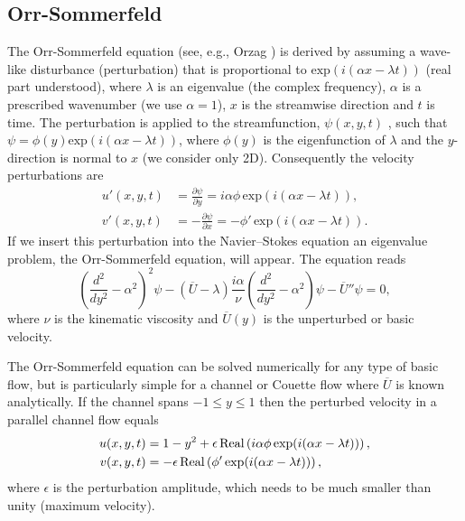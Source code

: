 \subsection{Orr-Sommerfeld}
\label{sec:mortensen:OS}
The Orr-Sommerfeld equation (see, e.g., Orzag \cite{Orzag1971}) is derived by assuming a wave-like disturbance (perturbation) that is proportional to $\text{exp}(i(\alpha x-\lambda t))$ (real part understood), where $\lambda$ is an eigenvalue (the complex frequency), $\alpha$ is a prescribed wavenumber (we use $\alpha=1$), $x$ is the streamwise direction and $t$ is time. The perturbation is applied to the streamfunction, $\psi(x,y,t)$ , such that $\psi=\phi(y) \text{exp}(i(\alpha x- \lambda t))$, where $\phi(y)$ is the eigenfunction of $\lambda$ and the $y$-direction is normal to $x$ (we consider only 2D). Consequently the velocity perturbations are
\begin{align}
 u'(x,y,t)&=\frac{\partial \psi}{\partial y}=i\alpha \phi \, \text{exp}(i(\alpha x- \lambda t)),\\
 v'(x,y,t)&=-\frac{\partial \psi}{\partial x}=-\phi' \, \text{exp}(i(\alpha x- \lambda t)).
\end{align}
If we insert this perturbation into the Navier--Stokes equation an eigenvalue problem, the Orr-Sommerfeld equation, will appear. The equation reads
\begin{equation}
 \left( \frac{d^2}{dy^2}-\alpha^2\right)^2\psi - \left(\overline{U}-\lambda \right) \frac{i \alpha}{\nu} \left( \frac{d^2}{dy^2}-\alpha^2\right)\psi - \overline{U}''\psi=0,
 \label{eq:mortensen:OrrS}
\end{equation}
where $\nu$ is the kinematic viscosity and $\overline{U}(y)$ is the unperturbed or basic velocity.

The Orr-Sommerfeld equation can be solved numerically for any type of basic flow, but is particularly simple for a channel or Couette flow where $\overline{U}$ is known analytically. If the channel spans $-1\leq y \leq 1$ then the perturbed velocity in a parallel channel flow equals
\begin{align}
 u(x,y,t)&=1-y^2+\epsilon \,\text{Real}\left(i\alpha \phi \, \text{exp}(i(\alpha x-\lambda t))\right), \notag \\
 v(x,y,t)&=-\epsilon \, \text{Real}\left(\phi' \, \text{exp}(i(\alpha x-\lambda t))\right),
\label{eq:mortensen:channel}
\end{align}
where $\epsilon$ is the perturbation amplitude, which needs to be much smaller than unity (maximum velocity).

